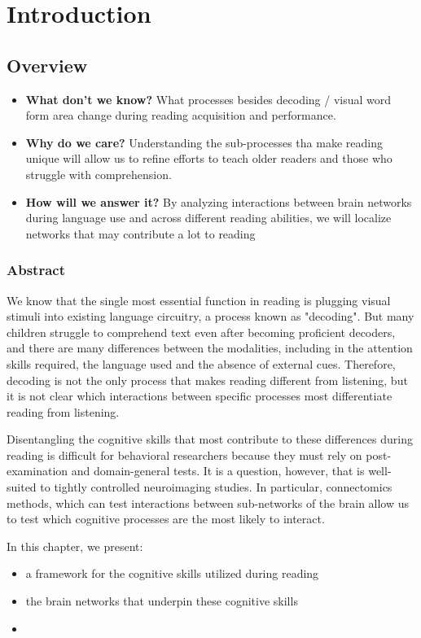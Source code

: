 \chapter{Introduction}

\section{Overview}
\begin{itemize}
	\item \textbf{What don't we know?} What processes besides decoding / visual word form area change during reading acquisition and performance.
	\item \textbf{Why do we care?} Understanding the sub-processes tha make reading unique will allow us to refine efforts to teach older readers and those who struggle with comprehension.
	\item \textbf{How will we answer it?} By analyzing interactions between brain networks during language use and across different reading abilities, we will localize networks that may contribute a lot to reading 
\end{itemize}


\subsection{Abstract}

We know that the single most essential function in reading is plugging visual stimuli into existing language circuitry, a process known as "decoding". But many children struggle to comprehend text even after becoming proficient decoders, and there are many differences between the modalities, including in the attention skills required, the language used and the absence of external cues. Therefore, decoding is not the only process that makes reading different from listening, but it is not clear which interactions between specific processes most differentiate reading from listening. 

Disentangling the cognitive skills that most contribute to these differences during reading is difficult for behavioral researchers because they must rely on post-examination and domain-general tests. It is a question, however, that is well-suited to tightly controlled neuroimaging studies. In particular, connectomics methods, which can test interactions between sub-networks of the brain allow us to test which cognitive processes are the most likely to interact. 

In this chapter, we present:
\begin{itemize}
	\item a framework for the cognitive skills utilized during reading
	\item the brain networks that underpin these cognitive skills
	\item 
\end{itemize}


